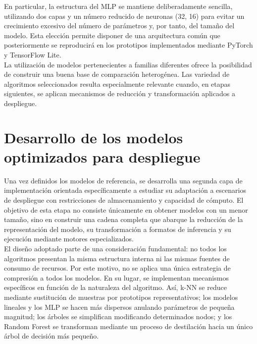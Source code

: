 \documentclass[a4paper,12pt,twoside,final]{book}
\begin{document}
En particular, la estructura del MLP se mantiene deliberadamente sencilla, utilizando dos capas y un número reducido de
neuronas (32, 16) para evitar un crecimiento excesivo del número de parámetros y, por tanto, del tamaño del modelo.
Esta elección permite disponer de una arquitectura común que posteriormente se reproducirá en los prototipos
implementados mediante PyTorch y TensorFlow Lite.\\

La utilización de modelos pertenecientes a familias diferentes ofrece la posibilidad de construir una buena base de
comparación heterogénea. Las variedad de algoritmos seleccionados resulta especialmente relevante cuando, en etapas
siguientes, se aplican mecanismos de reducción y transformación aplicados a despliegue.

\section{Desarrollo de los modelos optimizados para despliegue}
Una vez definidos los modelos de referencia, se desarrolla una segunda capa de implementación orientada específicamente
a estudiar su adaptación a escenarios de despliegue con restricciones de almacenamiento y capacidad de cómputo. El
objetivo de esta etapa no consiste únicamente en obtener modelos con un menor tamaño, sino en construir una cadena
completa que abarque la reducción de la representación del modelo, su transformación a formatos de inferencia y su
ejecución mediante motores especializados.\\

El diseño adoptado parte de una consideración fundamental: no todos los algoritmos presentan la misma estructura
interna ni las mismas fuentes de consumo de recursos. Por este motivo, no se aplica una única estrategia de compresión
a todos los modelos. En su lugar, se implementan mecanismos específicos en función de la naturaleza del algoritmo. Así,
k-NN se reduce mediante sustitución de muestras por prototipos representativos; los modelos lineales y los MLP se hacen
más dispersos anulando parámetros de pequeña magnitud; los árboles se simplifican modificando determinados nodos; y los
Random Forest se transforman mediante un proceso de destilación hacia un único árbol de decisión más pequeño.\\

\newpage
\end{document}
